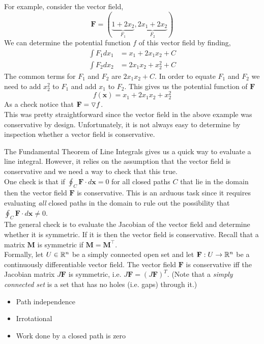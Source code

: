 \documentclass[12pt]{article}
\begin{document}
For example, consider the vector field,
\[
\mathbf{F}=(\underbrace{1+2x_2}_{F_1}, \underbrace{2x_1+2x_2}_{F_2})
\]
We can determine the potential function $f$ of this vector field by finding,
\begin{align*}
\int F_1 dx_1 &= x_1 + 2x_1x_2 + C \\
\int F_2 dx_2 &= 2x_1x_2 + x_2^2 + C
\end{align*}
The common terms for $F_1$ and $F_2$ are $2x_1x_2+C$. In order to equate $F_1$ and $F_2$ we need to add $x_2^2$ to $F_1$ and add $x_1$ to $F_2$. This gives us the potential function of $\mathbf{F}$
\[
f(\mathbf{x}) = x_1 + 2x_1x_2 + x_2^2
\]
As a check notice that $\mathbf{F}=\triangledown f$. \\

This was pretty straightforward since the vector field in the above example was conservative by design. Unfortunately, it is not always easy to determine by inspection whether a vector field is conservative. 

The Fundamental Theorem of Line Integrals gives us a quick way to evaluate a line integral. However, it relies on the assumption that the vector field is conservative and we need a way to check that this true. \\

One check is that if $\oint_C \mathbf{F} \cdot d\mathbf{x} = 0$ for all closed paths $C$ that lie in the domain then the vector field $\mathbf{F}$ is conservative. This is an arduous task since it requires evaluating \emph{all} closed paths in the domain to rule out the possibility that $\oint_C \mathbf{F} \cdot d\mathbf{x} \neq 0$. \\

The general check is to evaluate the Jacobian of the vector field and determine whether it is symmetric. If it is then the vector field is conservative. Recall that a matrix $\mathbf{M}$ is symmetric if $\mathbf{M}=\mathbf{M}^\top$. \\

Formally, let $U\in\mathbb{R}^n$ be a simply connected open set and let $\mathbf{F}:U\rightarrow\mathbb{R}^n$ be a continuously differentiable vector field. The vector field $\mathbf{F}$ is conservative iff the Jacobian matrix $J\mathbf{F}$ is symmetric, i.e. $J\mathbf{F}=(J\mathbf{F})^T$. (Note that a \emph{simply connected set} is a set that has no holes (i.e. gaps) through it.) \\

\begin{itemize}
\item Path independence
\item Irrotational
\item Work done by a closed path is zero
\end{itemize}
\end{document}
